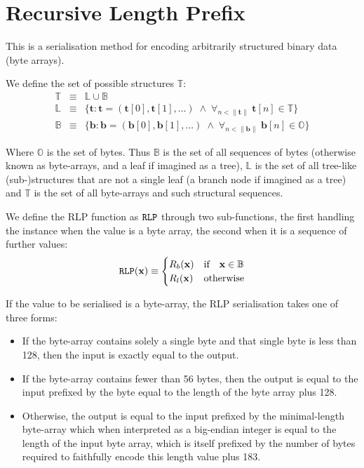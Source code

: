 \documentclass[9pt,oneside]{amsart}
\begin{document}
\section{Recursive Length Prefix}\label{app:rlp}
This is a serialisation method for encoding arbitrarily structured binary data (byte arrays).

We define the set of possible structures $\mathbb{T}$:
\begin{eqnarray}
\mathbb{T} & \equiv & \mathbb{L} \cup \mathbb{B} \\
\mathbb{L} & \equiv & \{ \mathbf{t}: \mathbf{t} = ( \mathbf{t}[0], \mathbf{t}[1], ... ) \; \wedge \; \forall_{n < \lVert \mathbf{t} \rVert} \; \mathbf{t}[n] \in \mathbb{T} \} \\
\mathbb{B} & \equiv & \{ \mathbf{b}: \mathbf{b} = ( \mathbf{b}[0], \mathbf{b}[1], ... ) \; \wedge \; \forall_{n < \lVert \mathbf{b} \rVert} \; \mathbf{b}[n] \in \mathbb{O} \}
\end{eqnarray}

Where $\mathbb{O}$ is the set of bytes. Thus $\mathbb{B}$ is the set of all sequences of bytes (otherwise known as byte-arrays, and a leaf if imagined as a tree), $\mathbb{L}$ is the set of all tree-like (sub-)structures that are not a single leaf (a branch node if imagined as a tree) and $\mathbb{T}$ is the set of all byte-arrays and such structural sequences.

We define the RLP function as $\mathtt{\tiny RLP}$ through two sub-functions, the first handling the instance when the value is a byte array, the second when it is a sequence of further values:
\begin{equation}
\mathtt{\tiny RLP}(\mathbf{x}) \equiv \begin{cases} R_b(\mathbf{x}) & \text{if} \quad \mathbf{x} \in \mathbb{B} \\ R_l(\mathbf{x}) & \text{otherwise} \end{cases}
\end{equation}

If the value to be serialised is a byte-array, the RLP serialisation takes one of three forms:

\begin{itemize}
\item If the byte-array contains solely a single byte and that single byte is less than 128, then the input is exactly equal to the output.
\item If the byte-array contains fewer than 56 bytes, then the output is equal to the input prefixed by the byte equal to the length of the byte array plus 128.
\item Otherwise, the output is equal to the input prefixed by the minimal-length byte-array which when interpreted as a big-endian integer is equal to the length of the input byte array, which is itself prefixed by the number of bytes required to faithfully encode this length value plus 183.
\end{itemize}
\end{document}

